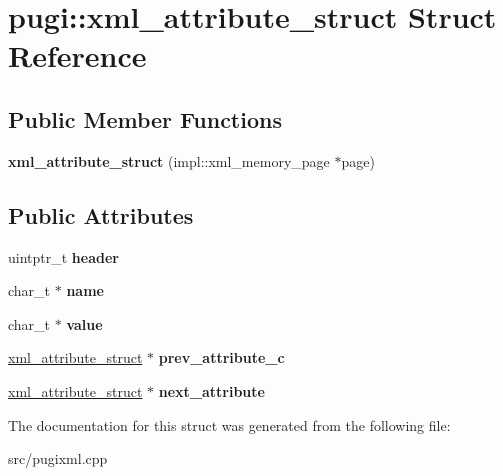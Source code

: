 \hypertarget{structpugi_1_1xml__attribute__struct}{}\section{pugi\+:\+:xml\+\_\+attribute\+\_\+struct Struct Reference}
\label{structpugi_1_1xml__attribute__struct}
\subsection*{Public Member Functions}
\begin{DoxyCompactItemize}
\item 
\mbox{\label{structpugi_1_1xml__attribute__struct_a57bb21cb72613e746a659efdd6425b94}} 
{\bfseries xml\+\_\+attribute\+\_\+struct} (impl\+::xml\+\_\+memory\+\_\+page $\ast$page)
\end{DoxyCompactItemize}
\subsection*{Public Attributes}
\begin{DoxyCompactItemize}
\item 
\mbox{\label{structpugi_1_1xml__attribute__struct_a0dca6ca6c129bbf87a7ebaf87f3e12de}} 
uintptr\+\_\+t {\bfseries header}
\item 
\mbox{\label{structpugi_1_1xml__attribute__struct_aa886c4aae23a132e1704717721ee2c19}} 
char\+\_\+t $\ast$ {\bfseries name}
\item 
\mbox{\label{structpugi_1_1xml__attribute__struct_ae652627d56cb9dcc0afdd1fbf6570364}} 
char\+\_\+t $\ast$ {\bfseries value}
\item 
\mbox{\label{structpugi_1_1xml__attribute__struct_a0e3a022235b316e4cfc1034ceb7d7862}} 
\hyperlink{structpugi_1_1xml__attribute__struct}{xml\+\_\+attribute\+\_\+struct} $\ast$ {\bfseries prev\+\_\+attribute\+\_\+c}
\item 
\mbox{\label{structpugi_1_1xml__attribute__struct_a9860c0eb7fa72dc9b69ee9b0575f9efc}} 
\hyperlink{structpugi_1_1xml__attribute__struct}{xml\+\_\+attribute\+\_\+struct} $\ast$ {\bfseries next\+\_\+attribute}
\end{DoxyCompactItemize}


The documentation for this struct was generated from the following file\+:\begin{DoxyCompactItemize}
\item 
src/pugixml.\+cpp\end{DoxyCompactItemize}
